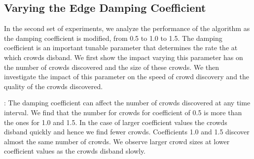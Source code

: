 \documentclass{sig-alternate}
\begin{document}


\subsection{Varying the Edge Damping Coefficient}
In the second set of experiments, we analyze the performance of the algorithm as the damping
coefficient is modified, from 0.5 to 1.0 to 1.5. The damping coefficient is an important tunable parameter that determines the rate the at which crowds disband. We first show the impact varying this parameter has on the number of
crowds discovered and the size of these crowds. We then investigate the impact of this parameter
 on the speed of crowd discovery and the quality of the crowds
discovered.

\medskip{}: The damping coefficient 
can affect the number of crowds discovered at any time interval. We find that the number for crowds for coefficient of 0.5 is more than the ones for 1.0 and 1.5. In the case of larger coefficient values the crowds disband
quickly and hence we find fewer crowds. Coefficients 1.0 and 1.5 discover
almost the same number of crowds. We observe larger crowd sizes at lower
coefficient values as the crowds disband slowly.
\end{document}
